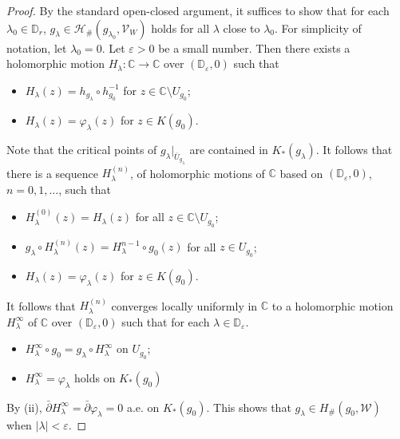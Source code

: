 \documentclass{amsart}
\numberwithin{equation}{section}
\newcommand{\C}{\mathbb C}
\theoremstyle{definition}
\theoremstyle{remark}
\begin{document}
\begin{proof}
By the standard open-closed argument, it suffices to show that for each $\lambda_0\in \mathbb{D}_r$, $g_\lambda\in \mathcal{H}_\#(g_{\lambda_0},\mathcal{V}_W)$ holds for all $\lambda$ close to $\lambda_0$. 
For simplicity of notation, let $\lambda_0=0$. 
Let $\varepsilon>0$ be a small number. Then there exists a holomorphic motion $H_\lambda:\mathbb{C}\to \mathbb{C}$ over $(\mathbb{D}_\varepsilon,0)$ such that 
\begin{itemize}
\item $H_\lambda(z)=h_{g_\lambda}\circ h_{g_0}^{-1}$ for $z\in \mathbb{C}\setminus U_{g_0}$;
\item $H_\lambda(z)=\varphi_\lambda(z)$ for $z\in K(g_0)$.
\end{itemize}
Note that the critical points of $g_\lambda|_{\overline{U}_{g_\lambda}}$ are contained in $K_*(g_\lambda)$. It follows that~ there is a sequence $H_\lambda^{(n)}$, of holomorphic motions of $\C$ based on $(\mathbb{D}_\varepsilon, 0)$, $n=0,1,\dots$, 
such that 
\begin{itemize}
\item $H_\lambda^{(0)}(z)=H_\lambda(z)$ for all $z\in \mathbb{C}\setminus U_{g_0}$;
\item $g_\lambda\circ H_\lambda^{(n)}(z)=H_{\lambda}^{n-1}\circ g_0(z)$ for all $z\in U_{g_0}$;
\item $H_\lambda(z)=\varphi_\lambda(z)$ for $z\in K(g_0)$. 
\end{itemize} 
It follows that $H_\lambda^{(n)}$ converges locally uniformly in $\mathbb{C}$ to a holomorphic motion $H_\lambda^\infty$ of $\C$ over $(\mathbb{D}_\varepsilon,0)$ such that for each $\lambda\in \mathbb{D}_\varepsilon$.
\begin{itemize}
\item[(i)] $H_\lambda^\infty\circ g_0=g_\lambda\circ H_\lambda^\infty$ on $U_{g_0}$;
\item[(ii)] $H_\lambda^\infty=\varphi_\lambda$ holds on $K_*(g_0)$ 
\end{itemize}
By (ii), $\bar{\partial} H_\lambda^\infty=\bar{\partial} \varphi_\lambda=0$ a.e. on $K_*(g_0)$. This shows that $g_\lambda\in H_\#(g_0,\mathcal{W})$ when $|\lambda|<\varepsilon$.

\end{proof}
\fi
\end{document}
